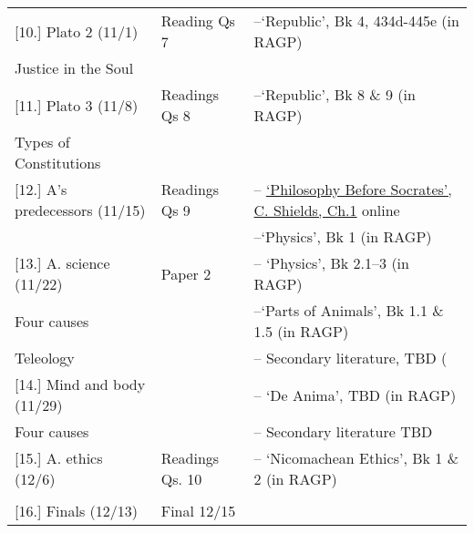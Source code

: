 \documentclass[article,oneside]{memoir}
\begin{document}
\begin{landscape}
\begin{center}
\begin{longtable}{p{8cm}p{4cm}p{8cm}}
[10.] Plato 2 (11/1)				& Reading Qs 7		&   --`Republic', Bk 4, 434d-445e (in RAGP) \\
Justice in the Soul	    			&					&   \\  [1.8\baselineskip] \hline

[11.] Plato 3 (11/8)				& Readings Qs 	8		& --`Republic', Bk 8 \& 9 (in RAGP)  \\ 	
Types of Constitutions                       & 					&   \\ [1.8\baselineskip] \hline
         			      
							
							
[12.] A's predecessors (11/15)		& Readings Qs 9 		& -- \href{https://scottoconnor.org/ancient/Shields2.pdf}{`Philosophy Before Socrates', C. Shields, Ch.1} online  \\ %
						 	&					& --`Physics', Bk 1 (in RAGP) \\ [1.8\baselineskip] \hline				

[13.] A. science  (11/22)			& Paper 2       		  	& -- `Physics',  Bk 2.1--3 (in RAGP) \\  
Four causes	    			 	&					& --`Parts of Animals', Bk 1.1 \& 1.5 (in RAGP) \\
Teleology						&					& -- Secondary literature, TBD ( \\ [1.8\baselineskip] \hline

[14.] Mind and body  (11/29)		&      		 		  & -- `De Anima', TBD (in RAGP) \\  
Four causes	    			 	&				& -- Secondary literature TBD \\ [1.8\baselineskip] \hline



[15.] A. ethics	(12/6)				& Readings Qs. 10	& -- `Nicomachean Ethics', Bk 1 \& 2 (in RAGP) \\
								&				& 	 \\ [1.8\baselineskip] \hline



[16.] Finals (12/13)					& Final 12/15		& \\ [1.8\baselineskip] \hline
	

\end{longtable}
\end{center}
\end{landscape}
\end{document}
